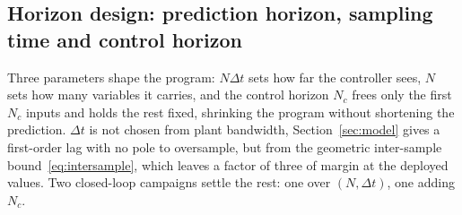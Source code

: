 \documentclass[11pt,a4paper]{article}
\newcommand{\Ninput}{N_c}
\begin{document}

\subsection{Horizon design: prediction horizon, sampling time and control horizon}
\label{sec:horizon}
\label{sec:nc}

Three parameters shape the program: $N\Delta t$ sets how far the controller sees, $N$ sets how many
variables it carries, and the control horizon $\Ninput$ frees only the first $\Ninput$ inputs and holds the
rest fixed, shrinking the program without shortening the prediction. $\Delta t$ is not chosen from plant
bandwidth, Section~\ref{sec:model} gives a first-order lag with no pole to oversample, but from the
geometric inter-sample bound~\eqref{eq:intersample}, which leaves a factor of three of margin at the deployed
values. Two closed-loop campaigns settle the rest: one over $(N,\Delta t)$, one adding $\Ninput$.

\end{document}
